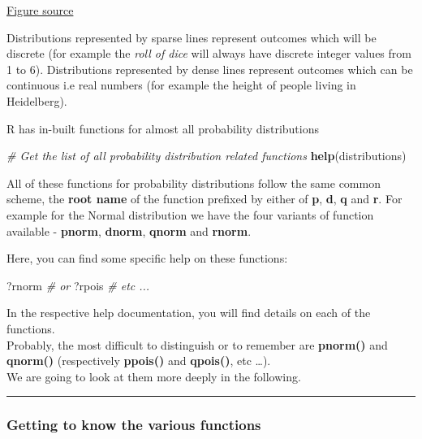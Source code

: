 \documentclass[
]{book}
\newenvironment{Shaded}{\begin{snugshade}}{\end{snugshade}}
\newcommand{\CommentTok}[1]{\textcolor[rgb]{0.56,0.35,0.01}{\textit{#1}}}
\newcommand{\FunctionTok}[1]{\textcolor[rgb]{0.13,0.29,0.53}{\textbf{#1}}}
\newcommand{\NormalTok}[1]{#1}
\begin{document}
\href{https://medium.com/@srowen/common-probability-distributions-347e6b945ce4}{Figure source}

Distributions represented by sparse lines represent outcomes which will be discrete (for example the \emph{roll of dice} will always have discrete integer values from 1 to 6). Distributions represented by dense lines represent outcomes which can be continuous i.e real numbers (for example the height of people living in Heidelberg).

R has in-built functions for almost all probability distributions

\begin{Shaded}
\begin{Highlighting}[]
\CommentTok{\# Get the list of all probability distribution related functions}
\FunctionTok{help}\NormalTok{(distributions)}
\end{Highlighting}
\end{Shaded}

All of these functions for probability distributions follow the same common scheme, the \textbf{root name} of the function prefixed by either of \textbf{p}, \textbf{d}, \textbf{q} and \textbf{r}. For example for the Normal distribution we have the four variants of function available - \textbf{pnorm}, \textbf{dnorm}, \textbf{qnorm} and \textbf{rnorm}.

Here, you can find some specific help on these functions:

\begin{Shaded}
\begin{Highlighting}[]
\NormalTok{?rnorm}
\CommentTok{\# or}
\NormalTok{?rpois}
\CommentTok{\# etc ...}
\end{Highlighting}
\end{Shaded}

In the respective help documentation, you will find details on each of the functions.\\
Probably, the most difficult to distinguish or to remember are \textbf{pnorm()} and \textbf{qnorm()} (respectively \textbf{ppois()} and \textbf{qpois()}, etc \ldots).\\
We are going to look at them more deeply in the following.

\begin{center}\rule{0.5\linewidth}{0.5pt}\end{center}

\hypertarget{getting-to-know-the-various-functions}{%
\subsubsection{Getting to know the various functions}\label{getting-to-know-the-various-functions}}
\end{document}
